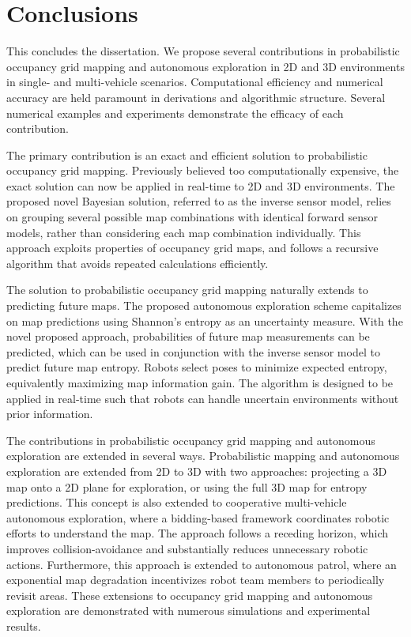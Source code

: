 \chapter{Conclusions}\label{chap:Conclusions}

This concludes the dissertation. We propose several contributions in probabilistic occupancy grid mapping and autonomous exploration in 2D and 3D environments in single- and multi-vehicle scenarios. Computational efficiency and numerical accuracy are held paramount in derivations and algorithmic structure. Several numerical examples and experiments demonstrate the efficacy of each contribution.

The primary contribution is an exact and efficient solution to probabilistic occupancy grid mapping. Previously believed too computationally expensive, the exact solution can now be applied in real-time to 2D and 3D environments. The proposed novel Bayesian solution, referred to as the inverse sensor model, relies on grouping several possible map combinations with identical forward sensor models, rather than considering each map combination individually. This approach exploits properties of occupancy grid maps, and follows a recursive algorithm that avoids repeated calculations efficiently.

The solution to probabilistic occupancy grid mapping naturally extends to predicting future maps. The proposed autonomous exploration scheme capitalizes on map predictions using Shannon's entropy as an uncertainty measure. With the novel proposed approach, probabilities of future map measurements can be predicted, which can be used in conjunction with the inverse sensor model to predict future map entropy. Robots select poses to minimize expected entropy, equivalently maximizing map information gain. The algorithm is designed to be applied in real-time such that robots can handle uncertain environments without prior information.

The contributions in probabilistic occupancy grid mapping and autonomous exploration are extended in several ways. Probabilistic mapping and autonomous exploration are extended from 2D to 3D with two approaches: projecting a 3D map onto a 2D plane for exploration, or using the full 3D map for entropy predictions. This concept is also extended to cooperative multi-vehicle autonomous exploration, where a bidding-based framework coordinates robotic efforts to understand the map. The approach follows a receding horizon, which improves collision-avoidance and substantially reduces unnecessary robotic actions. Furthermore, this approach is extended to autonomous patrol, where an exponential map degradation incentivizes robot team members to periodically revisit areas. These extensions to occupancy grid mapping and autonomous exploration are demonstrated with numerous simulations and experimental results.

